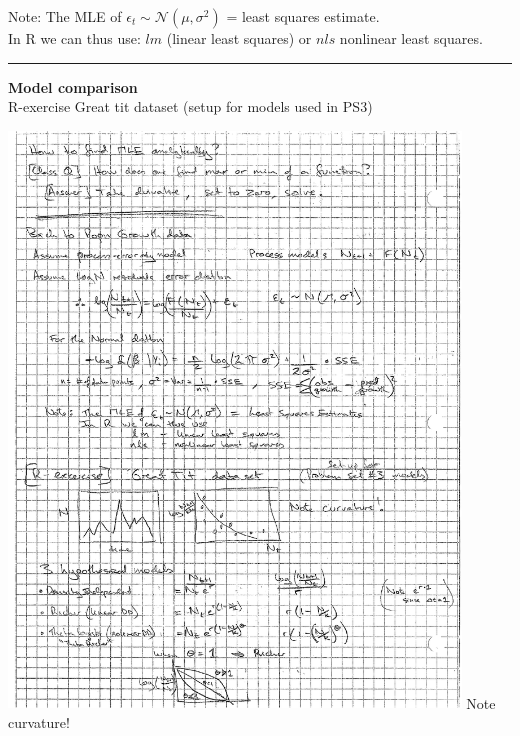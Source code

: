 \documentclass{article}
\newcommand{\note}[1]{\colorbox{gray!30}{#1}}
\newcommand{\ind}{\-\hspace{1cm}}
\begin{document}
Note: The MLE of $\epsilon_t \sim \mathcal{N}(\mu,\sigma^2)$ = least squares estimate.\\
\ind  In R we can thus use: $lm$ (linear least squares) or $nls$ nonlinear least squares.\\

\rule[0.5ex]{\linewidth}{1pt}
\pagebreak

\textbf{Model comparison}\\
\note{R-exercise} Great tit dataset (setup for models used in PS3)
\begin{center}
	\includegraphics[width=12cm]{figs/image7.pdf} Note curvature!
\end{center}
\end{document}
